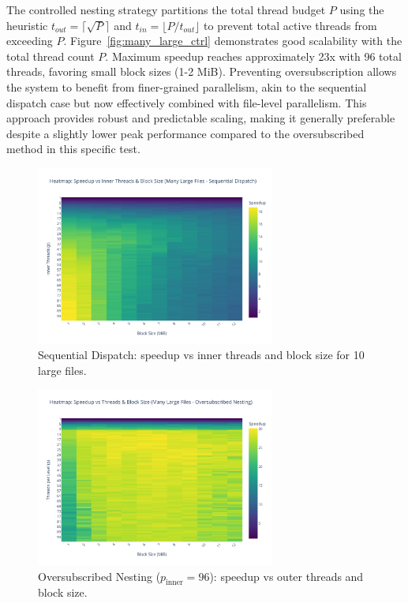 \documentclass[10pt]{article}
\begin{document}
The controlled nesting strategy partitions the total thread budget $P$ using the heuristic $t_{out} = \lceil \sqrt{P} \rceil$ and $t_{in} = \lfloor P / t_{out} \rfloor$ to prevent total active threads from exceeding $P$. Figure~\ref{fig:many_large_ctrl} demonstrates good scalability with the total thread count $P$. Maximum speedup reaches approximately 23x with 96 total threads, favoring small block sizes (1-2 MiB). Preventing oversubscription allows the system to benefit from finer-grained parallelism, akin to the sequential dispatch case but now effectively combined with file-level parallelism. This approach provides robust and predictable scaling, making it generally preferable despite a slightly lower peak performance compared to the oversubscribed method in this specific test.

\begin{figure}[H]
    \centering
    \includegraphics[width=0.7\textwidth]{../results/plots/many_large_sequential/speedup_matrix_many_large_sequential.pdf}
    \caption{Sequential Dispatch: speedup vs inner threads and block size for 10 large files.}
    \label{fig:many_large_seq}
\end{figure}

\begin{figure}[hbtp]
    \centering
    \includegraphics[width=0.7\textwidth]{../results/plots/many_large_parallel/speedup_matrix_many_large_parallel.pdf}
    \caption{Oversubscribed Nesting ($p_{\text{inner}}=96$): speedup vs outer threads and block size.}
    \label{fig:many_large_over}
\end{figure}
\end{document}
